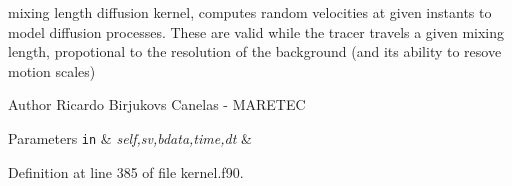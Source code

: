 mixing length diffusion kernel, computes random velocities at given instants to model diffusion processes. These are valid while the tracer travels a given mixing length, propotional to the resolution of the background (and its ability to resove motion scales) 

\begin{DoxyAuthor}{Author}
Ricardo Birjukovs Canelas -\/ M\+A\+R\+E\+T\+EC 
\end{DoxyAuthor}

\begin{DoxyParams}[1]{Parameters}
\mbox{\tt in}  & {\em self,sv,bdata,time,dt} & \\
\hline
\end{DoxyParams}


Definition at line 385 of file kernel.\+f90.


